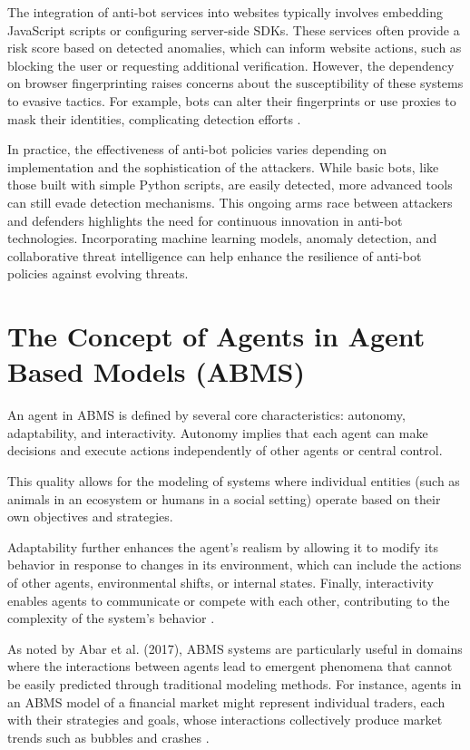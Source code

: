 The integration of anti-bot services into websites typically involves embedding JavaScript scripts or configuring server-side SDKs. These services often provide a risk score based on detected anomalies, which can inform website actions, such as blocking the user or requesting additional verification. However, the dependency on browser fingerprinting raises concerns about the susceptibility of these systems to evasive tactics. For example, bots can alter their fingerprints or use proxies to mask their identities, complicating detection efforts \cite{azad2020}.

In practice, the effectiveness of anti-bot policies varies depending on implementation and the sophistication of the attackers. While basic bots, like those built with simple Python scripts, are easily detected, more advanced tools can still evade detection mechanisms. This ongoing arms race between attackers and defenders highlights the need for continuous innovation in anti-bot technologies. Incorporating machine learning models, anomaly detection, and collaborative threat intelligence can help enhance the resilience of anti-bot policies against evolving threats.


\section{The Concept of Agents in Agent Based Models (ABMS)}

An agent in ABMS is defined by several core characteristics: autonomy, adaptability, and interactivity. Autonomy implies that each agent can make decisions and execute actions independently of other agents or central control.

This quality allows for the modeling of systems where individual entities (such as animals in an ecosystem or humans in a social setting) operate based on their own objectives and strategies. 

Adaptability further enhances the agent's realism by allowing it to modify its behavior in response to changes in its environment, which can include the actions of other agents, environmental shifts, or internal states. Finally, interactivity enables agents to communicate or compete with each other, contributing to the complexity of the system’s behavior \cite{abar2017}.

As noted by Abar et al. (2017), ABMS systems are particularly useful in domains where the interactions between agents lead to emergent phenomena that cannot be easily predicted through traditional modeling methods. For instance, agents in an ABMS model of a financial market might represent individual traders, each with their strategies and goals, whose interactions collectively produce market trends such as bubbles and crashes \cite{abar2017}.

